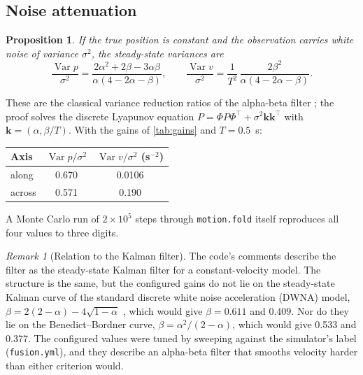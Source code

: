 \documentclass[11pt,a4paper]{article}
\newtheorem{proposition}{Proposition}
\theoremstyle{definition}
\theoremstyle{remark}
\newtheorem{remark}{Remark}
\newcommand{\code}[1]{\texttt{#1}}
\begin{document}
\subsection{Noise attenuation}

\begin{proposition}
If the true position is constant and the observation carries white noise of
variance $\sigma^2$, the steady-state variances are
\begin{equation}
\frac{\operatorname{Var} p}{\sigma^2} = \frac{2\alpha^2 + 2\beta - 3\alpha\beta}{\alpha(4-2\alpha-\beta)},
\qquad
\frac{\operatorname{Var} v}{\sigma^2} = \frac{1}{T^2}\,\frac{2\beta^2}{\alpha(4-2\alpha-\beta)} .
\end{equation}
\end{proposition}

These are the classical variance reduction ratios of the alpha-beta filter
\cite{benedict,kalata}; the proof solves the discrete Lyapunov equation
$P = \Phi P \Phi^\top + \sigma^2\mathbf{k}\mathbf{k}^\top$ with
$\mathbf k = (\alpha, \beta/T)$. With the gains of \cref{tab:gains} and
$T = 0.5$~s:
\begin{center}
\begin{tabular}{@{}lcc@{}}
\toprule
Axis & $\operatorname{Var}p/\sigma^2$ & $\operatorname{Var}v/\sigma^2$ (s$^{-2}$) \\
\midrule
along & 0.670 & 0.0106 \\
across & 0.571 & 0.190 \\
\bottomrule
\end{tabular}
\end{center}
A Monte Carlo run of $2\times10^5$ steps through \code{motion.fold} itself
reproduces all four values to three digits.

\begin{remark}[Relation to the Kalman filter]
The code's comments describe the filter as the steady-state Kalman filter for a
constant-velocity model. The structure is the same, but the configured gains do
not lie on the steady-state Kalman curve of the standard discrete white noise
acceleration (DWNA) model, $\beta = 2(2-\alpha) - 4\sqrt{1-\alpha}$
\cite{barshalom}, which would give $\beta = 0.611$ and $0.409$. Nor do they lie
on the Benedict--Bordner curve, $\beta = \alpha^2/(2-\alpha)$, which would give
0.533 and 0.377. The configured values were tuned by sweeping against the
simulator's label (\code{fusion.yml}), and they describe an alpha-beta filter
that smooths velocity harder than either criterion would.
\end{remark}
\end{document}
